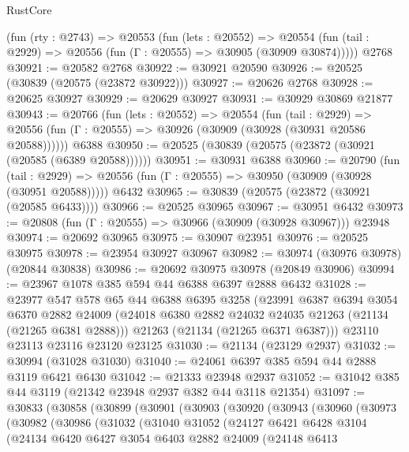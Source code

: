 \begin{lexlean}{RustCore}
\begin{coremodule}
    (fun (rty : @2743) =>
    @20553
      (fun (lets : @20552) =>
      @20554 (fun (tail : @2929) => @20556 (fun (Γ : @20555) => @30905 (@30909 @30874)))))
    @2768
@30921 := @20582 @2768
@30922 := @30921 @20590
@30926 := @20525 (@30839 (@20575 (@23872 @30922)))
@30927 := @20626 @2768
@30928 := @20625 @30927
@30929 := @20629 @30927
@30931 := @30929 @30869 @21877
@30943 := @20766
    (fun (lets : @20552) =>
    @20554
      (fun (tail : @2929) =>
      @20556 (fun (Γ : @20555) => @30926 (@30909 (@30928 (@30931 @20586 @20588))))))
    @6388
@30950 := @20525 (@30839 (@20575 (@23872 (@30921 (@20585 (@6389 @20588))))))
@30951 := @30931 @6388
@30960 := @20790
    (fun (tail : @2929) => @20556 (fun (Γ : @20555) => @30950 (@30909 (@30928 (@30951 @20588)))))
    @6432
@30965 := @30839 (@20575 (@23872 (@30921 (@20585 @6433))))
@30966 := @20525 @30965
@30967 := @30951 @6432
@30973 := @20808 (fun (Γ : @20555) => @30966 (@30909 (@30928 @30967))) @23948
@30974 := @20692 @30965
@30975 := @30907 @23951
@30976 := @20525 @30975
@30978 := @23954 @30927 @30967
@30982 := @30974 (@30976 @30978) (@20844 @30838)
@30986 := @20692 @30975 @30978 (@20849 @30906)
@30994 := @23967 @1078 @385 @594 @44 @6388 @6397 @2888 @6432
@31028 := @23977
    @547
    @578
    @65
    @44
    @6388
    @6395
    @3258
    (@23991
      @6387
      @6394
      @3054
      @6370
      @2882
      @24009
      (@24018 @6380 @2882 @24032 @24035 @21263 (@21134 (@21265 @6381 @2888)))
      @21263
      (@21134 (@21265 @6371 @6387)))
    @23110
    @23113
    @23116
    @23120
    @23125
@31030 := @21134 (@23129 @2937)
@31032 := @30994 (@31028 @31030)
@31040 := @24061 @6397 @385 @594 @44 @2888 @3119 @6421 @6430
@31042 := @21333 @23948 @2937
@31052 := @31042 @385 @44 @3119 (@21342 @23948 @2937 @382 @44 @3118 @21354)
@31097 := @30833
    (@30858
      (@30899
        (@30901
          (@30903
            (@30920
              (@30943
                (@30960
                  (@30973
                    (@30982
                      (@30986
                        (@31032
                          (@31040
                            @31052
                            (@24127
                              @6421
                              @6428
                              @3104
                              (@24134
                                @6420
                                @6427
                                @3054
                                @6403
                                @2882
                                @24009
                                (@24148
                                  @6413

\end{coremodule}
\end{lexlean}
